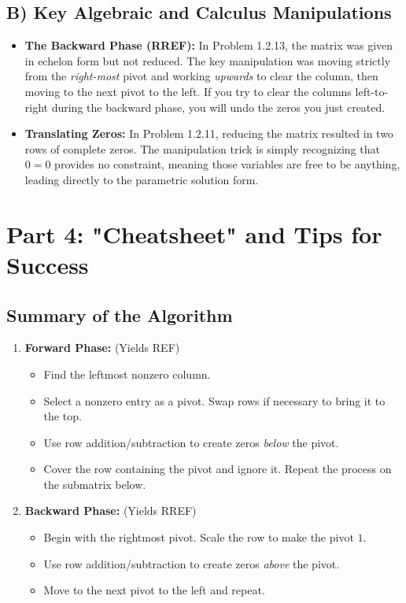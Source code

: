 \documentclass[11pt]{article}
\begin{document}
\subsection{B) Key Algebraic and Calculus Manipulations}
\begin{itemize}
    \item \textbf{The Backward Phase (RREF):} In Problem 1.2.13, the matrix was given in echelon form but not reduced. The key manipulation was moving strictly from the \textit{right-most} pivot and working \textit{upwards} to clear the column, then moving to the next pivot to the left. If you try to clear the columns left-to-right during the backward phase, you will undo the zeros you just created.
    \item \textbf{Translating Zeros:} In Problem 1.2.11, reducing the matrix resulted in two rows of complete zeros. The manipulation trick is simply recognizing that $0 = 0$ provides no constraint, meaning those variables are free to be anything, leading directly to the parametric solution form.
\end{itemize}

\newpage
\section{Part 4: "Cheatsheet" and Tips for Success}

\subsection{Summary of the Algorithm}
\begin{enumerate}
    \item \textbf{Forward Phase:} (Yields REF)
    \begin{itemize}
        \item Find the leftmost nonzero column.
        \item Select a nonzero entry as a pivot. Swap rows if necessary to bring it to the top.
        \item Use row addition/subtraction to create zeros \textit{below} the pivot.
        \item Cover the row containing the pivot and ignore it. Repeat the process on the submatrix below.
    \end{itemize}
    \item \textbf{Backward Phase:} (Yields RREF)
    \begin{itemize}
        \item Begin with the rightmost pivot. Scale the row to make the pivot $1$.
        \item Use row addition/subtraction to create zeros \textit{above} the pivot.
        \item Move to the next pivot to the left and repeat.
    \end{itemize}
\end{enumerate}
\end{document}

